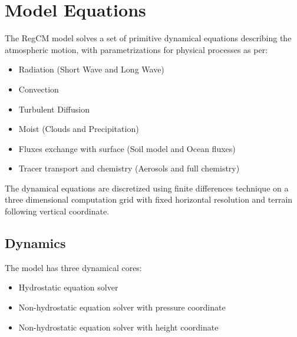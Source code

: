 
\newpage

\chapter{Model Equations}

The \ac{RegCM} model solves a set of primitive dynamical equations describing
the atmospheric motion, with parametrizations for physical processes as per:

\begin{itemize}
  \item Radiation (Short Wave and Long Wave)
  \item Convection
  \item Turbulent Diffusion
  \item Moist (Clouds and Precipitation)
  \item Fluxes exchange with surface (Soil model and Ocean fluxes)
  \item Tracer transport and chemistry (Aerosols and full chemistry)
\end{itemize}

The dynamical equations are discretized using finite differences technique
on a three dimensional computation grid with fixed horizontal resolution
and terrain following vertical coordinate.

\section{Dynamics}
The model has three dynamical cores:

\begin{itemize}
\item Hydrostatic equation solver
\item Non-hydrostatic equation solver with pressure coordinate
\item Non-hydrostatic equation solver with height coordinate
\end{itemize}

